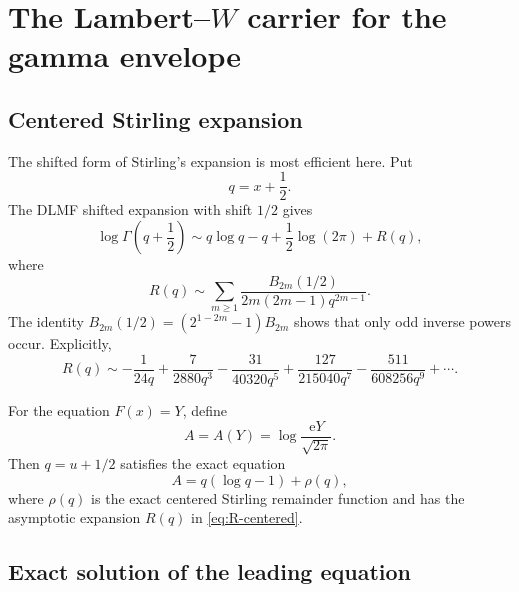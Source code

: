 \documentclass[11pt]{article}
\numberwithin{equation}{section}
\theoremstyle{mainthm}
\theoremstyle{defstyle}
\theoremstyle{remark}
\newcommand{\e}{\mathrm e}
\begin{document}
\section{The Lambert--\texorpdfstring{\(W\)}{W} carrier for the gamma envelope}\label{sec:gamma-carrier}

\subsection{Centered Stirling expansion}

The shifted form of Stirling's expansion is most efficient here.  Put
\begin{equation}\label{eq:q-shift}
 q=x+\frac12.
\end{equation}
The DLMF shifted expansion \cite{DLMF511} with shift \(1/2\) gives
\begin{equation}\label{eq:centered-stirling}
 \log\Gamma\!\left(q+\frac12\right)
 \sim q\log q-q+\frac12\log(2\pi)+R(q),
\end{equation}
where
\begin{equation}\label{eq:R-centered}
 R(q)\sim\sum_{m\ge1}\frac{B_{2m}(1/2)}{2m(2m-1)q^{2m-1}}.
\end{equation}
The identity
\(
 B_{2m}(1/2)=(2^{1-2m}-1)B_{2m}
\)
shows that only odd inverse powers occur.  Explicitly,
\begin{equation}\label{eq:R-first}
 R(q)\sim
 -\frac{1}{24q}+\frac{7}{2880q^3}
 -\frac{31}{40320q^5}+\frac{127}{215040q^7}
 -\frac{511}{608256q^9}+\cdots.
\end{equation}

For the equation \(F(x)=Y\), define
\begin{equation}\label{eq:A-def}
 A=A(Y)=\log\frac{\e Y}{\sqrt{2\pi}}.
\end{equation}
Then \(q=u+1/2\) satisfies the exact equation
\begin{equation}\label{eq:exact-q-equation}
 A=q(\log q-1)+\rho(q),
\end{equation}
where \(\rho(q)\) is the exact centered Stirling remainder function and has the asymptotic expansion \(R(q)\) in \cref{eq:R-centered}.

\subsection{Exact solution of the leading equation}
\end{document}
